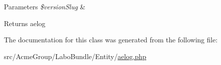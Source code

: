 \begin{DoxyParams}{Parameters}
{\em \$version\+Slug} & \\
\hline
\end{DoxyParams}
\begin{DoxyReturn}{Returns}
aelog 
\end{DoxyReturn}


The documentation for this class was generated from the following file\+:\begin{DoxyCompactItemize}
\item 
src/\+Acme\+Group/\+Labo\+Bundle/\+Entity/\hyperlink{_labo_bundle_2_entity_2aelog_8php}{aelog.\+php}\end{DoxyCompactItemize}
